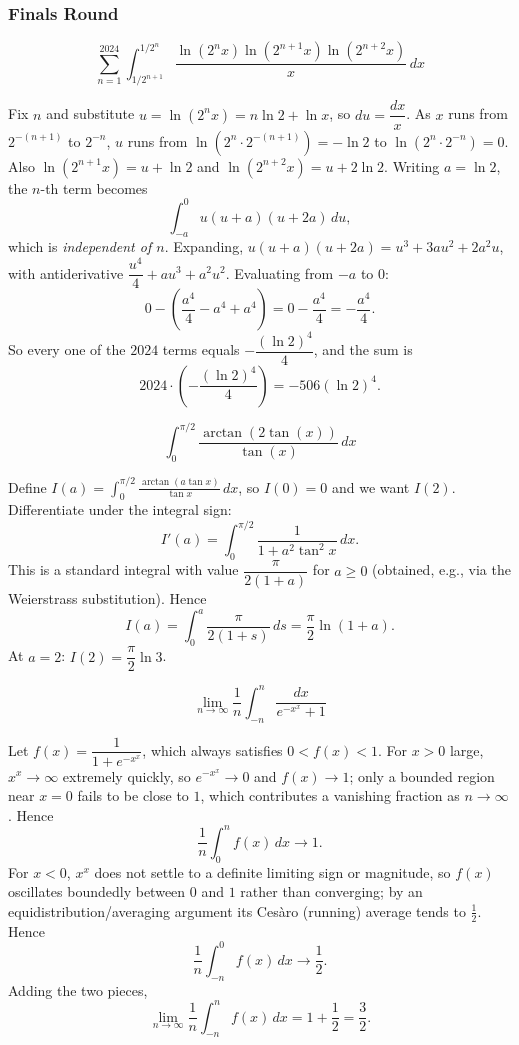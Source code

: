 \subsubsection*{Finals Round}
\begin{questions}

\question \[\sum_{n=1}^{2024}\int_{1/2^{n+1}}^{1/2^n} \frac{\ln(2^n x)\ln(2^{n+1}x)\ln(2^{n+2}x)}{x}\,dx\]
\begin{solution}
Fix $n$ and substitute $u=\ln(2^nx)=n\ln2+\ln x$, so $du=\dfrac{dx}{x}$. As $x$ runs from $2^{-(n+1)}$ to $2^{-n}$, $u$ runs from $\ln(2^n\cdot2^{-(n+1)})=-\ln2$ to $\ln(2^n\cdot2^{-n})=0$. Also $\ln(2^{n+1}x)=u+\ln2$ and $\ln(2^{n+2}x)=u+2\ln2$. Writing $a=\ln2$, the $n$-th term becomes
\[
\int_{-a}^{0} u(u+a)(u+2a)\,du,
\]
which is \emph{independent of $n$}. Expanding, $u(u+a)(u+2a)=u^3+3au^2+2a^2u$, with antiderivative $\dfrac{u^4}{4}+au^3+a^2u^2$. Evaluating from $-a$ to $0$:
\[
0-\left(\frac{a^4}{4}-a^4+a^4\right)=0-\frac{a^4}{4}=-\frac{a^4}{4}.
\]
So every one of the $2024$ terms equals $-\dfrac{(\ln2)^4}{4}$, and the sum is
\[
2024\cdot\left(-\frac{(\ln2)^4}{4}\right)=-506(\ln2)^4.
\]
\end{solution}

\question \[\int_0^{\pi/2} \frac{\arctan(2\tan(x))}{\tan(x)}\,dx\]
\begin{solution}
Define $I(a)=\displaystyle\int_0^{\pi/2}\frac{\arctan(a\tan x)}{\tan x}\,dx$, so $I(0)=0$ and we want $I(2)$. Differentiate under the integral sign:
\[
I'(a)=\int_0^{\pi/2}\frac{1}{1+a^2\tan^2x}\,dx.
\]
This is a standard integral with value $\dfrac{\pi}{2(1+a)}$ for $a\ge0$ (obtained, e.g., via the Weierstrass substitution). Hence
\[
I(a)=\int_0^a \frac{\pi}{2(1+s)}\,ds=\frac{\pi}{2}\ln(1+a).
\]
At $a=2$: $I(2)=\dfrac{\pi}{2}\ln3$.
\end{solution}

\question \[\lim_{n\to\infty}\frac1n\int_{-n}^{n}\frac{dx}{e^{-x^x}+1}\]
\begin{solution}
Let $f(x)=\dfrac{1}{1+e^{-x^x}}$, which always satisfies $0<f(x)<1$.
For $x>0$ large, $x^x\to\infty$ extremely quickly, so $e^{-x^x}\to0$ and $f(x)\to1$; only a bounded region near $x=0$ fails to be close to $1$, which contributes a vanishing fraction as $n\to\infty$. Hence
\[
\frac1n\int_0^n f(x)\,dx\longrightarrow 1.
\]
For $x<0$, $x^x$ does not settle to a definite limiting sign or magnitude, so $f(x)$ oscillates boundedly between $0$ and $1$ rather than converging; by an equidistribution/averaging argument its Ces\`aro (running) average tends to $\tfrac12$. Hence
\[
\frac1n\int_{-n}^0 f(x)\,dx\longrightarrow \frac12.
\]
Adding the two pieces,
\[
\lim_{n\to\infty}\frac1n\int_{-n}^n f(x)\,dx=1+\frac12=\frac32.
\]
\end{solution}


\end{questions}
